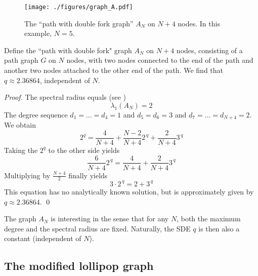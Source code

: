 \documentclass{comnet}%
\begin{document}
\begin{figure}[H]
	\centering
	\texttt{[image: ./figures/graph\_A.pdf]}
	\caption{The ``path with double fork graph'' $A_N$ on $N+4$ nodes. In this example, $N=5$.}
	\label{fig_graph_A}
\end{figure}
\begin{theorem}\label{thm_graph_An}
	Define the ``path with double fork" graph $A_N$ on $N+4$ nodes, consisting of a path graph $G$ on $N$ nodes, with two nodes connected to the end of the path and another two nodes attached to the other end of the path. We find that $q \approx 2.36864$, independent of $N$.
\end{theorem}
\textit{Proof.} The spectral radius equals (see \cite[Lemma 3]{cvetkovic1974spectra})
\begin{equation*}
	\lambda_1(A_N) = 2
\end{equation*}
The degree sequence $d_1 = \ldots = d_4 = 1$ and $d_5 = d_6 = 3$ and $d_7 = \ldots = d_{N+4} = 2$. We obtain
\begin{equation*}
	2^q = \frac{4}{N+4} + \frac{N-2}{N+4} 2^{\, q} + \frac{2}{N+4} 3^{\, q}
\end{equation*}
Taking the $2^q$ to the other side yields
\begin{equation*}
	\frac{6}{N+4} 2^{\, q} = \frac{4}{N+4} + \frac{2}{N+4} 3^{\, q}
\end{equation*}
Multiplying by $\frac{N+4}{2}$ finally yields
\begin{equation*}
	3 \cdot 2^{\, q} = 2 + 3^{\, q}
\end{equation*}
This equation has no analytically known solution, but is approximately given by $q \approx 2.36864$. \hfill\qed

The graph $A_N$ is interesting in the sense that for any $N$, both the maximum degree and the spectral radius are fixed. Naturally, the SDE $q$ is then also a constant (independent of $N$).


\subsection{The modified lollipop graph}
\end{document}
